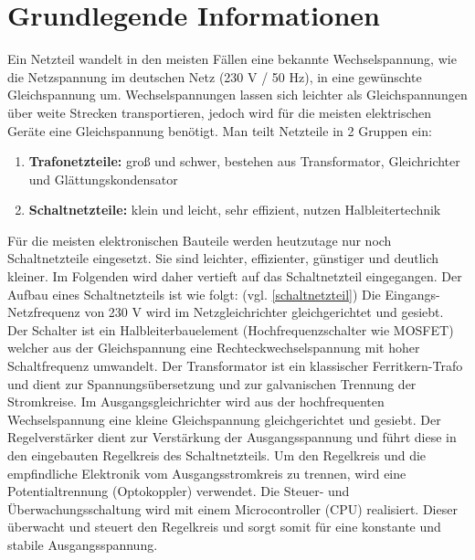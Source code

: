 \section{Grundlegende Informationen}
Ein Netzteil wandelt in den meisten Fällen eine bekannte Wechselspannung, wie die Netzspannung im deutschen Netz (230 V / 50 Hz), in eine gewünschte Gleichspannung um. Wechselspannungen lassen sich leichter als Gleichspannungen über weite Strecken transportieren, jedoch wird für die meisten elektrischen Geräte eine Gleichspannung benötigt. 
Man teilt Netzteile in 2 Gruppen ein: \cite{Hering:2024}
\begin{enumerate}
	\item \textbf{Trafonetzteile:} groß und schwer, bestehen aus Transformator, Gleichrichter und Glättungskondensator
	\item \textbf{Schaltnetzteile:} klein und leicht, sehr effizient, nutzen Halbleitertechnik
\end{enumerate}
Für die meisten elektronischen Bauteile werden heutzutage nur noch Schaltnetzteile eingesetzt. Sie sind leichter, effizienter, günstiger und deutlich kleiner. Im Folgenden wird daher vertieft auf das Schaltnetzteil eingegangen.\cite{Haeberle:2018} Der Aufbau eines Schaltnetzteils ist wie folgt: (vgl. \ref{schaltnetzteil}) Die Eingangs-Netzfrequenz von 230 V wird im Netzgleichrichter gleichgerichtet und gesiebt. Der Schalter ist ein Halbleiterbauelement (Hochfrequenzschalter wie MOSFET) welcher aus der Gleichspannung eine Rechteckwechselspannung mit hoher Schaltfrequenz umwandelt. Der Transformator ist ein klassischer Ferritkern-Trafo und dient zur Spannungsübersetzung und zur galvanischen Trennung der Stromkreise. Im Ausgangsgleichrichter wird aus der hochfrequenten Wechselspannung eine kleine Gleichspannung gleichgerichtet und gesiebt. Der Regelverstärker dient zur Verstärkung der Ausgangsspannung und führt diese in den eingebauten Regelkreis des Schaltnetzteils. Um den Regelkreis und die empfindliche Elektronik vom Ausgangsstromkreis zu trennen, wird eine Potentialtrennung (Optokoppler) verwendet. Die Steuer- und Überwachungsschaltung wird mit einem Microcontroller (CPU) realisiert. Dieser überwacht und steuert den Regelkreis und sorgt somit für eine konstante und stabile Ausgangsspannung. \cite{Haeberle:2018}

